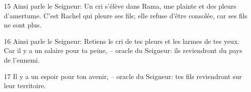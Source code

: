 15 Ainsi parle le Seigneur: Un cri s’élève dans Rama, une plainte et des pleurs d’amertume. C’est Rachel qui pleure ses fils; elle refuse d’être consolée, car ses fils ne sont plus.

16 Ainsi parle le Seigneur: Retiens le cri de tes pleurs et les larmes de tes yeux. Car il y a un salaire pour ta peine, – oracle du Seigneur: ils reviendront du pays de l’ennemi.

17 Il y a un espoir pour ton avenir, – oracle du Seigneur: tes fils reviendront sur leur territoire.
